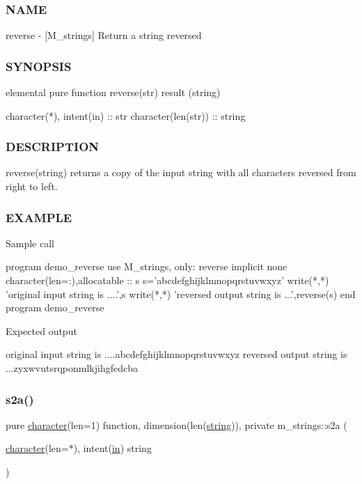 \subsubsection*{N\+A\+ME}

reverse -\/ \mbox{[}M\+\_\+strings\mbox{]} Return a string reversed 

\subsubsection*{S\+Y\+N\+O\+P\+S\+IS}

\begin{DoxyVerb}elemental pure function reverse(str) result (string)

 character(*), intent(in) :: str
 character(len(str))      :: string
\end{DoxyVerb}


\subsubsection*{D\+E\+S\+C\+R\+I\+P\+T\+I\+ON}

reverse(string) returns a copy of the input string with all characters reversed from right to left.

\subsubsection*{E\+X\+A\+M\+P\+LE}

\begin{DoxyVerb}Sample call

   program demo_reverse
   use M_strings, only: reverse
   implicit none
   character(len=:),allocatable  :: s
      s='abcdefghijklmnopqrstuvwxyz'
      write(*,*) 'original input string is ....',s
      write(*,*) 'reversed output string is ...',reverse(s)
   end program demo_reverse

Expected output

  original input string is ....abcdefghijklmnopqrstuvwxyz
  reversed output string is ...zyxwvutsrqponmlkjihgfedcba \end{DoxyVerb}
 \mbox{\label{namespacem__strings_a5b05f337c8851871a4fb0b3cf56663cd}} 
\subsubsection{\texorpdfstring{s2a()}{s2a()}}
{\footnotesize\ttfamily pure \hyperlink{option__stopwatch_83_8txt_abd4b21fbbd175834027b5224bfe97e66}{character}(len=1) function, dimension(len(\hyperlink{what__overview_81_8txt_a74cb7e955273b9f9157b4f0c18a38849}{string})), private m\+\_\+strings\+::s2a (\begin{DoxyParamCaption}\item[{\hyperlink{option__stopwatch_83_8txt_abd4b21fbbd175834027b5224bfe97e66}{character}(len=$\ast$), intent(\hyperlink{M__journal_83_8txt_afce72651d1eed785a2132bee863b2f38}{in})}]{string }\end{DoxyParamCaption})\hspace{0.3cm}{\ttfamily [private]}}

